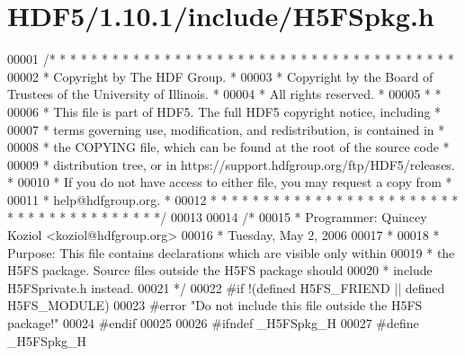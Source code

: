 \hypertarget{_h_d_f5_21_810_81_2include_2_h5_f_spkg_8h_source}{}\section{H\+D\+F5/1.10.1/include/\+H5\+F\+Spkg.h}
\label{_h_d_f5_21_810_81_2include_2_h5_f_spkg_8h_source}

\begin{DoxyCode}
00001 \textcolor{comment}{/* * * * * * * * * * * * * * * * * * * * * * * * * * * * * * * * * * * * * * *}
00002 \textcolor{comment}{ * Copyright by The HDF Group.                                               *}
00003 \textcolor{comment}{ * Copyright by the Board of Trustees of the University of Illinois.         *}
00004 \textcolor{comment}{ * All rights reserved.                                                      *}
00005 \textcolor{comment}{ *                                                                           *}
00006 \textcolor{comment}{ * This file is part of HDF5.  The full HDF5 copyright notice, including     *}
00007 \textcolor{comment}{ * terms governing use, modification, and redistribution, is contained in    *}
00008 \textcolor{comment}{ * the COPYING file, which can be found at the root of the source code       *}
00009 \textcolor{comment}{ * distribution tree, or in https://support.hdfgroup.org/ftp/HDF5/releases.  *}
00010 \textcolor{comment}{ * If you do not have access to either file, you may request a copy from     *}
00011 \textcolor{comment}{ * help@hdfgroup.org.                                                        *}
00012 \textcolor{comment}{ * * * * * * * * * * * * * * * * * * * * * * * * * * * * * * * * * * * * * * */}
00013 
00014 \textcolor{comment}{/*}
00015 \textcolor{comment}{ * Programmer:  Quincey Koziol <koziol@hdfgroup.org>}
00016 \textcolor{comment}{ *              Tuesday, May  2, 2006}
00017 \textcolor{comment}{ *}
00018 \textcolor{comment}{ * Purpose:     This file contains declarations which are visible only within}
00019 \textcolor{comment}{ *              the H5FS package.  Source files outside the H5FS package should}
00020 \textcolor{comment}{ *              include H5FSprivate.h instead.}
00021 \textcolor{comment}{ */}
00022 \textcolor{preprocessor}{#if !(defined H5FS\_FRIEND || defined H5FS\_MODULE)}
00023 \textcolor{preprocessor}{#error "Do not include this file outside the H5FS package!"}
00024 \textcolor{preprocessor}{#endif}
00025 
00026 \textcolor{preprocessor}{#ifndef \_H5FSpkg\_H}
00027 \textcolor{preprocessor}{#define \_H5FSpkg\_H}

\end{DoxyCode}

